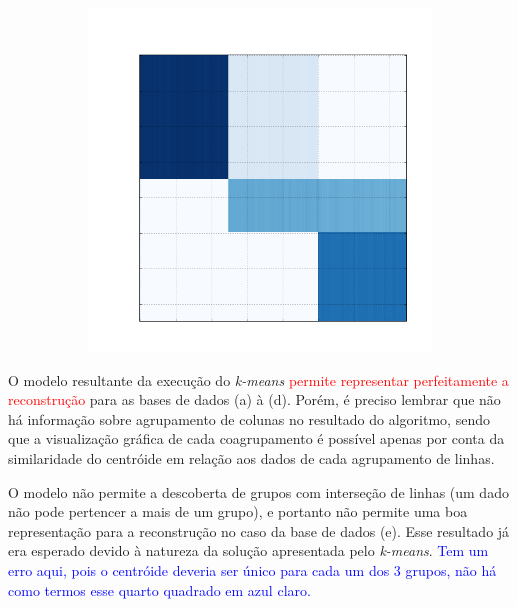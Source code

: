 \documentclass[
    12pt,                %
    oneside,            %
    a4paper,            %
    english,            %
    brazil                %
    ]{abntex2ppgsi}
\begin{document}
\begin{figure}[H]
\begin{subfigure}[b]{0.18\textwidth}
        \caption{}
    \end{subfigure}
    \begin{subfigure}[b]{0.18\textwidth}
        \includegraphics[width=\textwidth]{img/e-reconstruction-kmeans.png}
        \caption{}
    \end{subfigure}
    \label{fig:reconstruction:kmeans}
\end{figure}


O modelo resultante da execução do \textit{k-means} \textcolor{red}{permite representar perfeitamente a  reconstrução} para as bases de dados (a) à (d). Porém, é preciso lembrar que não há informação sobre agrupamento de colunas no resultado do algoritmo, sendo que a visualização gráfica de cada coagrupamento é possível apenas por conta da similaridade do centróide em relação aos dados de cada agrupamento de linhas.

O modelo não permite a descoberta de grupos com interseção de linhas (um dado não pode pertencer a mais de um grupo), e portanto não permite uma boa representação para a reconstrução no caso da base de dados (e). Esse resultado já era esperado devido à natureza da solução apresentada pelo \textit{k-means}. \textcolor{blue}{Tem um erro aqui, pois o centróide deveria ser único para cada um dos 3 grupos, não há como termos esse quarto quadrado em azul claro.}
\end{document}
